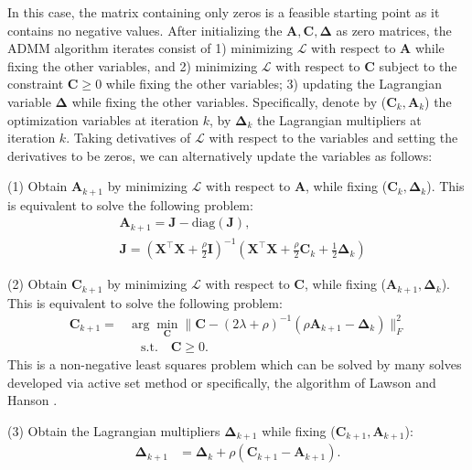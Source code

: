 \documentclass[10pt,twocolumn,letterpaper]{article}
\begin{document}
In this case, the matrix containing only zeros is a feasible starting point as it contains no negative values. After initializing the $\bm{A},\bm{C},\bm{\Delta}$ as zero matrices, the ADMM algorithm iterates consist of 1) minimizing $\mathcal{L}$ with respect to $\bm{A}$ while fixing the other variables, and 2) minimizing $\mathcal{L}$ with respect to $\bm{C}$ subject to the constraint $\bm{C}\ge0$ while fixing the other variables; 3) updating the Lagrangian variable $\bm{\Delta}$ while fixing the other variables. Specifically, denote by ($\bm{C}_{k},\bm{A}_{k}$) the optimization variables at iteration $k$, by $\bm{\Delta}_{k}$ the Lagrangian multipliers at iteration $k$. Taking detivatives of $\mathcal{L}$ with respect to the variables and setting the derivatives to be zeros, we can alternatively update the variables as follows:

(1) Obtain $\bm{A}_{k+1}$ by minimizing $\mathcal{L}$ with respect to $\bm{A}$, while fixing ($\bm{C}_{k},\bm{\Delta}_{k}$). This is equivalent to solve the following problem:
\begin{equation}
\begin{split}
\label{e14}
&
\bm{A}_{k+1}
=
\bm{J}-\text{diag}(\bm{J}),
\\
&
\bm{J}
=
(\bm{X}^{\top}\bm{X}+\frac{\rho}{2}\bm{I})^{-1}
(\bm{X}^{\top}\bm{X}+\frac{\rho}{2}\bm{C}_{k}+\frac{1}{2}\bm{\Delta}_{k})
\end{split}
\end{equation}

(2) Obtain $\bm{C}_{k+1}$ by minimizing $\mathcal{L}$ with respect to $\bm{C}$, while fixing ($\bm{A}_{k+1},\bm{\Delta}_{k}$). This is equivalent to solve the following problem:
\begin{equation}
\begin{split}
\label{e15}
\bm{C}_{k+1}
=
&
\arg\min_{\bm{C}}
\|
\bm{C}-(2\lambda+\rho)^{-1}(\rho\bm{A}_{k+1}-\bm{\Delta}_{k})
\|_{F}^{2}
\\
&
\quad
\text{s.t.}
\quad 
\bm{C}\ge 0
.
\end{split}
\end{equation}
This is a non-negative least squares problem which can be solved by many solves developed via active set method \cite{Nocedal2006NO} or specifically, the algorithm of Lawson and Hanson \cite{}.

(3) Obtain the Lagrangian multipliers $\bm{\Delta}_{k+1}$ while fixing ($\bm{C}_{k+1},\bm{A}_{k+1}$):
\begin{equation}
\begin{split}
\label{e16}
\bm{\Delta}_{k+1}
&
=
\bm{\Delta}_{k}
+
\rho
(\bm{C}_{k+1}-\bm{A}_{k+1})
.
\end{split}
\end{equation}
\end{document}
